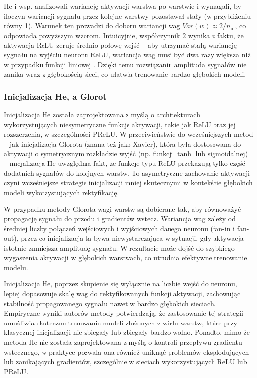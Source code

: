 He i wsp. analizowali wariancję aktywacji warstwa po warstwie i wymagali, by iloczyn wariancji sygnału przez kolejne warstwy pozostawał stały (w przybliżeniu równy 1). Warunek ten prowadzi do doboru wariancji wag $Var(w) \approx 2/n_{\text{in}}$, co odpowiada powyższym wzorom. Intuicyjnie, współczynnik $2$ wynika z faktu, że aktywacja ReLU zeruje średnio połowę wejść – aby utrzymać stałą wariancję sygnału na wyjściu neuronu ReLU, wariancja wag musi być dwa razy większa niż w przypadku funkcji liniowej
\cite{he2015}. Dzięki temu rozwiązaniu amplituda sygnałów nie zanika wraz z głębokością sieci, co ułatwia trenowanie bardzo głębokich modeli.

\subsubsection*{Inicjalizacja He, a Glorot}
Inicjalizacja He została zaprojektowana z myślą o architekturach wykorzystujących niesymetryczne funkcje aktywacji, takie jak ReLU oraz jej rozszerzenia, w szczególności PReLU. W przeciwieństwie do wcześniejszych metod – jak inicjalizacja Glorota (znana też jako Xavier), która była dostosowana do aktywacji o symetrycznym rozkładzie wyjść (np. funkcji $\tanh$ lub sigmoidalnej) – inicjalizacja He uwzględnia fakt, że funkcje typu ReLU przekazują tylko część dodatnich sygnałów do kolejnych warstw. To asymetryczne zachowanie aktywacji czyni wcześniejsze strategie inicjalizacji mniej skutecznymi w kontekście głębokich modeli wykorzystujących rektyfikację.

W przypadku metody Glorota wagi warstw są dobierane tak, aby równoważyć propagację sygnału do przodu i gradientów wstecz. Wariancja wag zależy od średniej liczby połączeń wejściowych i wyjściowych danego neuronu (fan-in i fan-out), przez co inicjalizacja ta bywa niewystarczająca w sytuacji, gdy aktywacja istotnie zmniejsza amplitudę sygnału. W rezultacie może dojść do szybkiego wygaszenia aktywacji w głębokich warstwach, co utrudnia efektywne trenowanie modelu.

Inicjalizacja He, poprzez skupienie się wyłącznie na liczbie wejść do neuronu, lepiej dopasowuje skalę wag do rektyfikowanych funkcji aktywacji, zachowując stabilność propagowanego sygnału nawet w bardzo głębokich sieciach. Empiryczne wyniki autorów metody potwierdzają, że zastosowanie tej strategii umożliwia skuteczne trenowanie modeli złożonych z wielu warstw, które przy klasycznej inicjalizacji nie zbiegały lub zbiegały bardzo wolno. Ponadto, mimo że metoda He nie została zaprojektowana z myślą o kontroli przepływu gradientu wstecznego, w praktyce pozwala ona również uniknąć problemów eksplodujących lub zanikających gradientów, szczególnie w sieciach wykorzystujących ReLU lub PReLU.




